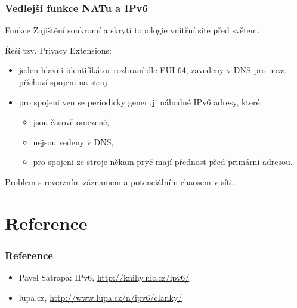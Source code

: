 \documentclass{beamer}
\begin{document}
\begin{frame} \frametitle{Vedlejší funkce NATu a IPv6}

\begin{block}{Funkce}
Zajištění soukromí a skrytí topologie vnitřní site před světem.
\end{block}

Řeší tzv. Privacy Extensions:
\begin{itemize}
\item jeden hlavni identifikátor rozhraní dle EUI-64, zavedeny v DNS pro nova příchozí spojeni na stroj
\item pro spojeni ven se periodicky generuji náhodné IPv6 adresy, které:
  \begin{itemize}
  \item jsou časově omezené,
  \item nejsou vedeny v DNS,
  \item pro spojeni ze stroje někam pryč mají přednost před primární adresou.
  \end{itemize}
\end{itemize}

Problem s reverzním záznamem a potenciálním chaosem v síti.

\end{frame}

%
%

\section{Reference}

\begin{frame}
\frametitle{Reference}
\begin{itemize}

\item Pavel Satrapa: IPv6, \url{http://knihy.nic.cz/ipv6/}
\item lupa.cz, \url{http://www.lupa.cz/n/ipv6/clanky/}

\end{itemize}
\end{frame}
\end{document}
